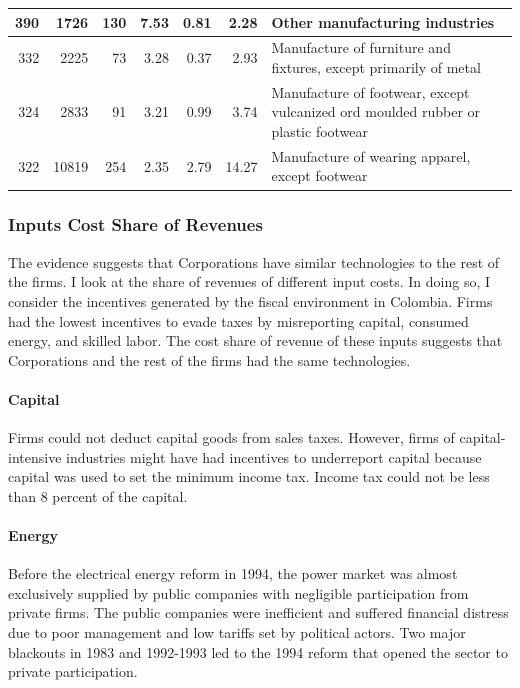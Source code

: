 \documentclass[
  12pt]{article}
\let\oldparagraph\paragraph
\renewcommand{\paragraph}[1]{\oldparagraph{#1}\mbox{}}
\theoremstyle{definition}
\theoremstyle{remark}
\begin{document}
\begin{table}
{\begin{tabular}[t]{r|r|r|r|r|r|l}
\hline
390 & 1726 & 130 & 7.53 & 0.81 & 2.28 & Other manufacturing industries\\
\hline
332 & 2225 & 73 & 3.28 & 0.37 & 2.93 & Manufacture of furniture and fixtures, except primarily of metal\\
\hline
324 & 2833 & 91 & 3.21 & 0.99 & 3.74 & Manufacture of footwear, except vulcanized ord moulded rubber or plastic footwear\\
\hline
322 & 10819 & 254 & 2.35 & 2.79 & 14.27 & Manufacture of wearing apparel, except footwear\\
\hline
\end{tabular}

}

\end{table}%

\subsubsection{Inputs Cost Share of
Revenues}\label{inputs-cost-share-of-revenues}

The evidence suggests that Corporations have similar technologies to the
rest of the firms. I look at the share of revenues of different input
costs. In doing so, I consider the incentives generated by the fiscal
environment in Colombia. Firms had the lowest incentives to evade taxes
by misreporting capital, consumed energy, and skilled labor. The cost
share of revenue of these inputs suggests that Corporations and the rest
of the firms had the same technologies.

\paragraph{Capital}\label{capital}

Firms could not deduct capital goods from sales taxes. However, firms of
capital-intensive industries might have had incentives to underreport
capital because capital was used to set the minimum income tax. Income
tax could not be less than 8 percent of the capital.

\paragraph{Energy}\label{energy}

Before the electrical energy reform in 1994, the power market was almost
exclusively supplied by public companies with negligible participation
from private firms. The public companies were inefficient and suffered
financial distress due to poor management and low tariffs set by
political actors. Two major blackouts in 1983 and 1992-1993 led to the
1994 reform that opened the sector to private participation.
\end{document}
